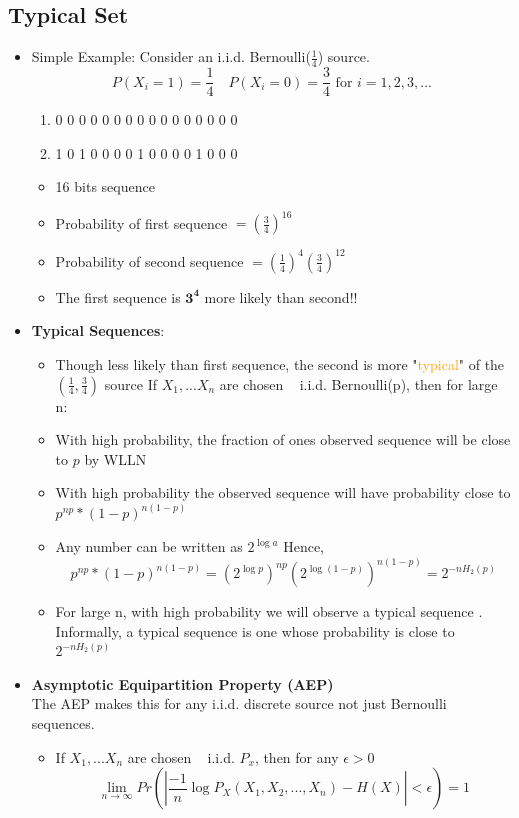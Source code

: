 \documentclass[24pt]{article}
\begin{document}
\subsection{Typical Set}
\begin{itemize}
\item Simple Example: Consider an i.i.d. Bernoulli($\frac{1}{4}$) source.
$$P(X_i =1) =\frac{1}{4} \quad P(X_i = 0) = \frac{3}{4} \textrm{ for } i=1,2,3,... $$
\begin{enumerate}
\item  0 0 0 0 0 0 0 0 0 0 0 0 0 0 0 0
\item  1 0 1 0 0 0 0 1 0 0 0 0 1 0 0 0
\end{enumerate}
\begin{itemize}
\item 16 bits sequence 
\item Probability of first sequence $=(\frac{3}{4})^16$
\item Probability of second sequence $=(\frac{1}{4})^4(\frac{3}{4})^12$
\item The first sequence is $\mathbf{3^4}$ more likely than second!!
\end{itemize}

\item \textbf{Typical Sequences}:
\begin{itemize}
\item Though less likely than first sequence, the second is more "\textcolor{orange}{typical}" of the $(\frac{1}{4},\frac{3}{4})$ source
If $X_1,...X_n$ are chosen ~ i.i.d. Bernoulli(p), then for large n:
\item With high probability, the fraction of ones observed sequence will be close to $p$ by WLLN
\item With high probability the observed sequence will have probability close to $p^{np}*(1-p)^{n(1-p)}$
\item Any number can be written as $2^{\log a}$ Hence,
$$p^{np}*(1-p)^{n(1-p)} = (2^{\log p})^{np}(2^{\log (1-p)})^{n(1-p)} = 2^{-nH_2(p)}$$
\item For large n, with high probability we will observe a \textcolor{blue1}{typical sequence }. Informally, a typical sequence is one whose probability is close to $2^{-nH_2(p)}$
\end{itemize}
\item \textbf{Asymptotic Equipartition Property (AEP)}\\
The AEP makes this for any i.i.d. discrete source not just Bernoulli sequences. \\
\begin{itemize}
\item If $X_1,...X_n$ are chosen ~ i.i.d. $P_x$, then for any $\epsilon > 0$
$$\lim_{n \rightarrow \infty} Pr\left(\left| \frac{-1}{n} \log P_X(X_1,X_2,...,X_n) - H(X)\right| < \epsilon \right) = 1$$


\end{itemize}
\end{itemize}
\end{document}
